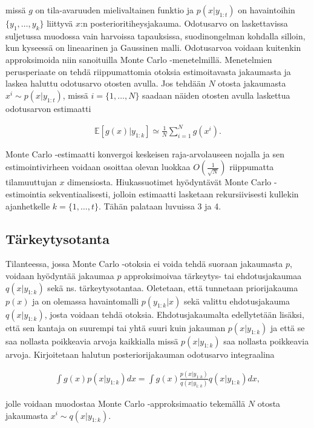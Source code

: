 \documentclass[
  12pt,
  a4paper, twoside]{book}
\begin{document}
\noindent missä \(g\) on tila-avaruuden mielivaltainen funktio ja \(p(x|y_{1:t})\) on havaintoihin \(\{y_1,\ldots,y_k\}\) liittyvä \(x\):n posterioritiheysjakauma. Odotusarvo on laskettavissa suljetussa muodossa vain harvoissa tapauksissa, suodinongelman kohdalla silloin, kun kyseessä on lineaarinen ja Gaussinen malli. Odotusarvoa voidaan kuitenkin approksimoida niin sanoituilla Monte Carlo -menetelmillä. Menetelmien perusperiaate on tehdä riippumattomia otoksia estimoitavasta jakaumasta ja laskea haluttu odotusarvo otosten avulla. Jos tehdään \(N\) otosta jakaumasta \(x^i\sim p(x|y_{1:t})\), missä \(i=\{1,\ldots,N\}\) saadaan näiden otosten avulla laskettua odotusarvon estimaatti

\begin{align}
\mathbb{E}[g(x)|y_{1:k}]\simeq\frac{1}{N}\sum_{i=1}^N g(x^i).
\end{align}

Monte Carlo -estimaatti konvergoi keskeisen raja-arvolauseen nojalla ja sen estimointivirheen voidaan osoittaa olevan luokkaa \(O(\frac{1}{\sqrt{N}})\) riippumatta tilamuuttujan \(x\) dimensiosta. Hiukassuotimet hyödyntävät Monte Carlo -estimointia sekventiaalisesti, jolloin estimaatti lasketaan rekursiivisesti kullekin ajanhetkelle \(k=\{1,\ldots, t\}\). Tähän palataan luvuissa 3 ja 4.

\subsection{Tärkeytysotanta}

Tilanteessa, jossa Monte Carlo -otoksia ei voida tehdä suoraan jakaumasta \(p\), voidaan hyödyntää jakaumaa \(p\) approksimoivaa tärkeytys- tai ehdotusjakaumaa \(q(x|y_{1:k})\) sekä ns. tärkeytysotantaa. Oletetaan, että tunnetaan priorijakauma \(p(x)\) ja on olemassa havaintomalli \(p(y_{1:k}|x)\) sekä valittu ehdotusjakauma \(q(x|y_{1:k})\), josta voidaan tehdä otoksia. Ehdotusjakaumalta edellytetään lisäksi, että sen kantaja on suurempi tai yhtä suuri kuin jakauman \(p(x|y_{1:k})\) ja että se saa nollasta poikkeavia arvoja kaikkialla missä \(p(x|y_{1:k})\) saa nollasta poikkeavia arvoja. Kirjoitetaan halutun posteriorijakauman odotusarvo integraalina

\begin{align}
\int g(x)p(x|y_{1:k})dx=\int g(x)\frac{p(x|y_{1:k})}{q(x|y_{1:k})}q(x|y_{1:k})dx,
\end{align}

\noindent jolle voidaan muodostaa Monte Carlo -approksimaatio tekemällä \(N\) otosta jakaumasta \(x^i \sim q(x|y_{1:k})\).
\end{document}
